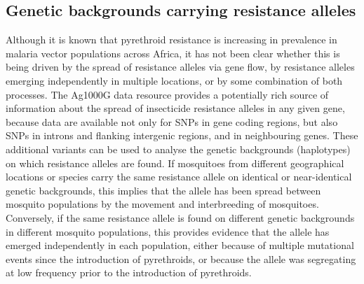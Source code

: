 \documentclass[a4paper,11pt,abstracton,hidelinks]{scrartcl}
\begin{document}
\subsection*{Genetic backgrounds carrying resistance alleles}

% 
Although it is known that pyrethroid resistance is increasing in prevalence in malaria vector populations across Africa, it has not been clear whether this is being driven by the spread of resistance alleles via gene flow, by resistance alleles emerging independently in multiple locations, or by some combination of both processes.
%
The Ag1000G data resource provides a potentially rich source of information about the spread of insecticide resistance alleles in any given gene, because data are available not only for SNPs in gene coding regions, but also SNPs in introns and flanking intergenic regions, and in neighbouring genes.
%
These additional variants can be used to analyse the genetic backgrounds (haplotypes) on which resistance alleles are found.
%
If mosquitoes from different geographical locations or species carry the same resistance allele on identical or near-identical genetic backgrounds, this implies that the allele has been spread between mosquito populations by the movement and interbreeding of mosquitoes.
%
Conversely, if the same resistance allele is found on different genetic backgrounds in different mosquito populations, this provides evidence that the allele has emerged independently in each population, either because of multiple mutational events since the introduction of pyrethroids, or because the allele was segregating at low frequency prior to the introduction of pyrethroids. 
\end{document}

